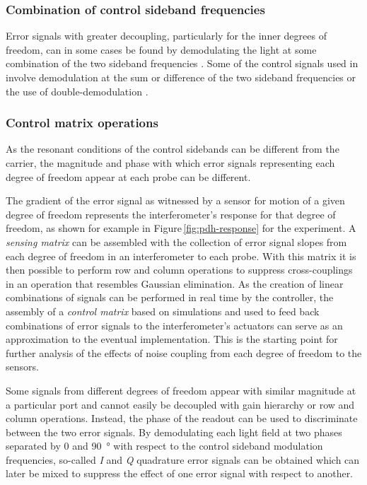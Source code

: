 \subsubsection{\label{sec:sideband-beats}Combination of control sideband frequencies}
Error signals with greater decoupling, particularly for the inner degrees of freedom, can in some cases be found by demodulating the light at some combination of the two sideband frequencies \cite{Strain2003, Barr2006}. Some of the control signals used in \ALIGO{} involve demodulation at the sum or difference of the two sideband frequencies \cite{Abbott2010} or the use of double-demodulation \cite{Staley2014}.

\subsubsection{\label{sec:control-matrix-operations}Control matrix operations}
As the resonant conditions of the control sidebands can be different from the carrier, the magnitude and phase with which error signals representing each degree of freedom appear at each probe can be different.

The gradient of the error signal as witnessed by a sensor for motion of a given degree of freedom represents the interferometer's response for that degree of freedom, as shown for example in Figure\,\ref{fig:pdh-response} for the \SSM{} experiment. A \emph{sensing matrix} can be assembled with the collection of error signal slopes from each degree of freedom in an interferometer to each probe. With this matrix it is then possible to perform row and column operations to suppress cross-couplings in an operation that resembles Gaussian elimination. As the creation of linear combinations of signals can be performed in real time by the controller, the assembly of a \emph{control matrix} based on simulations and used to feed back combinations of error signals to the interferometer's actuators can serve as an approximation to the eventual implementation. This is the starting point for further analysis of the effects of noise coupling from each degree of freedom to the sensors.

Some signals from different degrees of freedom appear with similar magnitude at a particular port and cannot easily be decoupled with gain hierarchy or row and column operations. Instead, the phase of the readout can be used to discriminate between the two error signals. By demodulating each light field at two phases separated by \num{0} and \SI{90}{\degree} with respect to the control sideband modulation frequencies, so-called \emph{I} and \emph{Q} quadrature error signals can be obtained which can later be mixed to suppress the effect of one error signal with respect to another.

